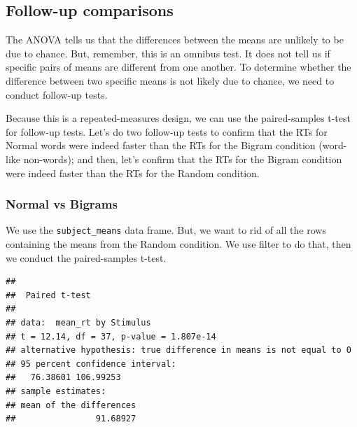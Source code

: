 \documentclass[]{book}
\newenvironment{Shaded}{\begin{snugshade}}{\end{snugshade}}
\newcommand{\KeywordTok}[1]{\textcolor[rgb]{0.13,0.29,0.53}{\textbf{#1}}}
\newcommand{\DataTypeTok}[1]{\textcolor[rgb]{0.13,0.29,0.53}{#1}}
\newcommand{\StringTok}[1]{\textcolor[rgb]{0.31,0.60,0.02}{#1}}
\newcommand{\OtherTok}[1]{\textcolor[rgb]{0.56,0.35,0.01}{#1}}
\newcommand{\OperatorTok}[1]{\textcolor[rgb]{0.81,0.36,0.00}{\textbf{#1}}}
\newcommand{\NormalTok}[1]{#1}
\begin{document}
\subsection{Follow-up comparisons}\label{follow-up-comparisons}

The ANOVA tells us that the differences between the means are unlikely
to be due to chance. But, remember, this is an omnibus test. It does not
tell us if specific pairs of means are different from one another. To
determine whether the difference between two specific means is not
likely due to chance, we need to conduct follow-up tests.

Because this is a repeated-measures design, we can use the
paired-samples t-test for follow-up tests. Let's do two follow-up tests
to confirm that the RTs for Normal words were indeed faster than the RTs
for the Bigram condition (word-like non-words); and then, let's confirm
that the RTs for the Bigram condition were indeed faster than the RTs
for the Random condition.

\subsubsection{Normal vs Bigrams}\label{normal-vs-bigrams}

We use the \texttt{subject\_means} data frame. But, we want to rid of
all the rows containing the means from the Random condition. We use
filter to do that, then we conduct the paired-samples t-test.

\begin{Shaded}
\end{Shaded}

\begin{verbatim}
## 
##  Paired t-test
## 
## data:  mean_rt by Stimulus
## t = 12.14, df = 37, p-value = 1.807e-14
## alternative hypothesis: true difference in means is not equal to 0
## 95 percent confidence interval:
##   76.38601 106.99253
## sample estimates:
## mean of the differences 
##                91.68927
\end{verbatim}
\end{document}

